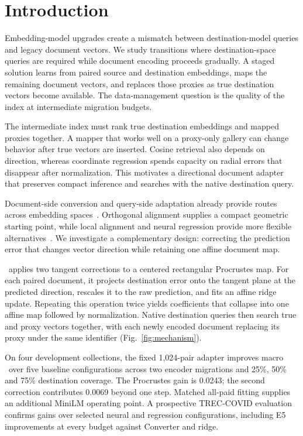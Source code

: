 \section{Introduction}
\label{sec:introduction}
Embedding-model upgrades create a mismatch between destination-model queries and legacy document vectors. We study transitions where destination-space queries are required while document encoding proceeds gradually. A staged solution learns from paired source and destination embeddings, maps the remaining document vectors, and replaces those proxies as true destination vectors become available. The data-management question is the quality of the index at intermediate migration budgets.

The intermediate index must rank true destination embeddings and mapped proxies together. A mapper that works well on a proxy-only gallery can change behavior after true vectors are inserted. Cosine retrieval also depends on direction, whereas coordinate regression spends capacity on radial errors that disappear after normalization. This motivates a directional document adapter that preserves compact inference and searches with the native destination query.

Document-side conversion and query-side adaptation already provide routes across embedding spaces~\cite{embeddingconverter,driftadapter}. Orthogonal alignment supplies a compact geometric starting point, while local alignment and neural regression provide more flexible alternatives~\cite{la2m,simplelinear}. We investigate a complementary design: correcting the prediction error that changes vector direction while retaining one affine document map.

\method\ applies two tangent corrections to a centered rectangular Procrustes map. For each paired document, it projects destination error onto the tangent plane at the predicted direction, rescales it to the raw prediction, and fits an affine ridge update. Repeating this operation twice yields coefficients that collapse into one affine map followed by normalization. Native destination queries then search true and proxy vectors together, with each newly encoded document replacing its proxy under the same identifier (Fig.~\ref{fig:mechanism}).

On four development collections, the fixed 1,024-pair adapter improves macro \ndcg\ over five baseline configurations across two encoder migrations and 25\%, 50\% and 75\% destination coverage. The Procrustes gain is 0.0243; the second correction contributes 0.0069 beyond one step. Matched all-paid fitting supplies an additional MiniLM operating point. A prospective TREC-COVID evaluation confirms gains over selected neural and regression configurations, including E5 improvements at every budget against Converter and ridge.

